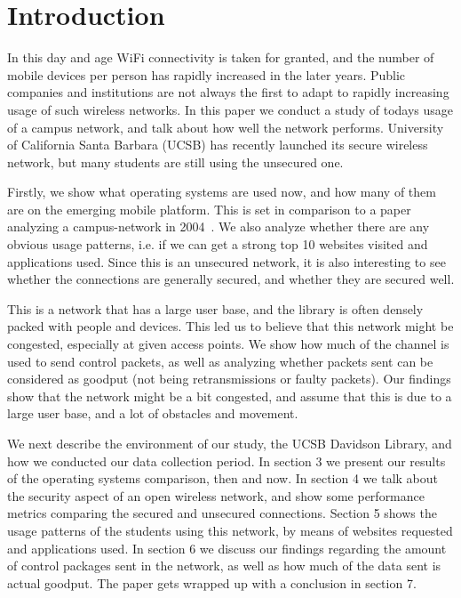 \documentclass[letterpaper,twocolumn,10pt]{article}
\begin{document}
\section{Introduction}

In this day and age WiFi connectivity is taken for granted, and the number of mobile devices per person has rapidly increased in the later years. Public companies and institutions are not always the first to adapt to rapidly increasing usage of such wireless networks. In this paper we conduct a study of todays usage of a campus network, and talk about how well the network performs. University of California Santa Barbara (UCSB) has recently launched its secure wireless network, but many students are still using the unsecured one.

Firstly, we show what operating systems are used now, and how many of them are on the emerging mobile platform. This is set in comparison to a paper analyzing a campus-network in 2004~\cite{Campus2004}. We also analyze whether there are any obvious usage patterns, i.e. if we can get a strong top 10 websites visited and applications used. Since this is an unsecured network, it is also interesting to see whether the connections are generally secured, and whether they are secured well.

This is a network that has a large user base, and the library is often densely packed with people and devices. This led us to believe that this network might be congested, especially at given access points. We show how much of the channel is used to send control packets, as well as analyzing whether packets sent can be considered as goodput (not being retransmissions or faulty packets). Our findings show that the network might be a bit congested, and assume that this is due to a large user base, and a lot of obstacles and movement.

We next describe the environment of our study, the UCSB Davidson Library, and how we conducted our data collection period. In section 3 we present our results of the operating systems comparison, then and now. In section 4 we talk about the security aspect of an open wireless network, and show some performance metrics comparing the secured and unsecured connections. Section 5 shows the usage patterns of the students using this network, by means of websites requested and applications used. In section 6 we discuss our findings regarding the amount of control packages sent in the network, as well as how much of the data sent is actual goodput. The paper gets wrapped up with a conclusion in section 7.
\end{document}

